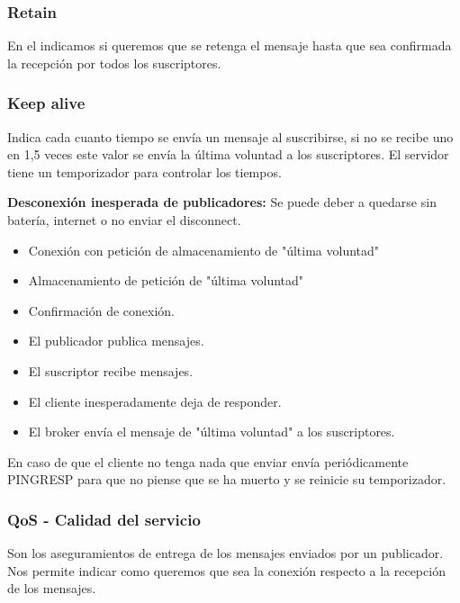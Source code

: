 \documentclass[12pt, twoside, openright]{report} %
\begin{document}
\subsubsection{Retain}
En el indicamos si queremos que se retenga el mensaje hasta que sea confirmada la recepción por todos los suscriptores.

\subsubsection{Keep alive}
Indica cada cuanto tiempo se envía un mensaje al suscribirse, si no se recibe uno en 1,5 veces este valor se envía la última voluntad a los suscriptores. El servidor tiene un temporizador para controlar los tiempos.

\textbf{Desconexión inesperada de publicadores:} Se puede deber a quedarse sin batería, internet o no enviar el disconnect.
\begin{itemize}
	\item Conexión con petición de almacenamiento de "última voluntad"
	\item Almacenamiento de petición de "última voluntad"
	\item Confirmación de conexión.
	\item El publicador publica mensajes.
	\item El suscriptor recibe mensajes.
	\item El cliente inesperadamente deja de responder.
	\item El broker envía el mensaje de "última voluntad" a los suscriptores.
\end{itemize}
En caso de que el cliente no tenga nada que enviar envía periódicamente PINGRESP para que no piense que se ha muerto y se reinicie su temporizador.


\subsubsection{QoS - Calidad del servicio}
Son los aseguramientos de entrega de los mensajes enviados por un publicador. Nos permite indicar como queremos que sea la conexión respecto a la recepción de los mensajes.
\end{document}
